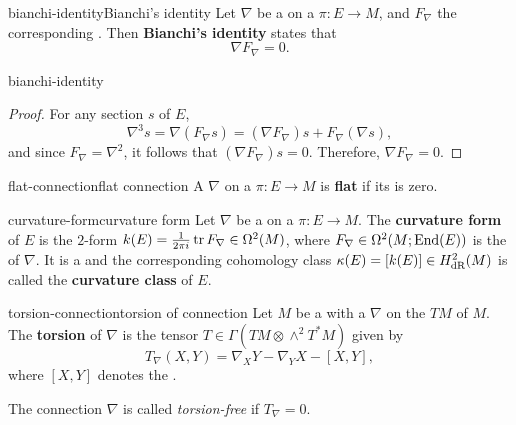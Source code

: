 \begin{topic}{bianchi-identity}{Bianchi's identity}
    Let $\nabla$ be a  on a  $\pi : E \to M$, and $F_\nabla$ the corresponding . Then \textbf{Bianchi's identity} states that
    \[ \nabla F_\nabla = 0 . \]
\end{topic}

\begin{example}{bianchi-identity}
    \begin{proof}
        For any section $s$ of $E$,
        \[ \nabla^3 s = \nabla (F_\nabla s) = (\nabla F_\nabla) s + F_\nabla (\nabla s) , \]
        and since $F_\nabla = \nabla^2$, it follows that $(\nabla F_\nabla) s = 0$. Therefore, $\nabla F_\nabla = 0$.
    \end{proof}
\end{example}

\begin{topic}{flat-connection}{flat connection}
    A  $\nabla$ on a  $\pi : E \to M$ is \textbf{flat} if its  is zero.
\end{topic}

\begin{topic}{curvature-form}{curvature form}
    Let $\nabla$ be a  on a  $\pi : E \to M$. The \textbf{curvature form} of $E$ is the $2$-form $k(E) = \frac{1}{2 \pi i} \operatorname{tr} F_\nabla \in \Omega^2(M)$, where $F_\nabla \in \Omega^2(M; \textup{End}(E))$ is the  of $\nabla$. It is a  and the corresponding cohomology class $\kappa(E) = [k(E)] \in H_\textup{dR}^2(M)$ is called the \textbf{curvature class} of $E$.
\end{topic}

\begin{topic}{torsion-connection}{torsion of connection}
    Let $M$ be a  with a  $\nabla$ on the  $TM$ of $M$. The \textbf{torsion} of $\nabla$ is the tensor $T \in \Gamma(TM \otimes \wedge^2 T^* M)$ given by
    \[ T_\nabla(X, Y) = \nabla_X Y  - \nabla_Y X - [X, Y] , \]
    where $[X, Y]$ denotes the .
    
    The connection $\nabla$ is called \textit{torsion-free} if $T_\nabla = 0$.
\end{topic}

